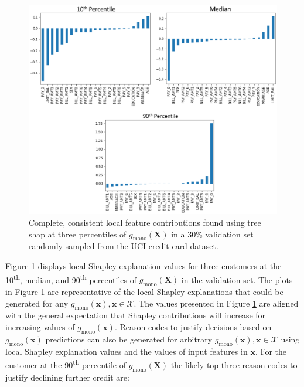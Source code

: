 \documentclass[11pt]{asaproc}
\begin{document}
\begin{figure}[htb]
	\begin{center}
		\includegraphics[scale=0.6]{img/figure_10.eps}
		\caption{Complete, consistent local feature contributions found using tree shap at three percentiles of $g_{\text{mono}}(\mathbf{X})$ in a 30\% validation set randomly sampled from the UCI credit card dataset.}
		\label{fig:cc_shap}
	\end{center}
\end{figure}

Figure \ref{fig:cc_shap} displays local Shapley explanation values for three customers at the 10\textsuperscript{th}, median, and 90\textsuperscript{th} percentiles of $g_{\text{mono}}(\mathbf{X})$ in the validation set. The plots in Figure \ref{fig:cc_shap} are representative of the local Shapley explanations that could be generated for any $g_{\text{mono}}(\mathbf{x}), \mathbf{x} \in \mathcal{X}$. The values presented in Figure \ref{fig:cc_shap} are aligned with the general expectation that Shapley contributions will increase for increasing values of $g_{\text{mono}}(\mathbf{x})$. Reason codes to justify decisions based on $g_{\text{mono}}(\mathbf{x})$ predictions can also be generated for arbitrary $g_{\text{mono}}(\mathbf{x}), \mathbf{x} \in \mathcal{X}$ using local Shapley explanation values and the values of input features in $\mathbf{x}$. For the customer at the 90\textsuperscript{th} percentile of $g_{\text{mono}}(\mathbf{X})$ the likely top three reason codes to justify declining further credit are:
\end{document}
